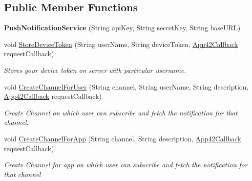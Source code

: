 \subsection*{Public Member Functions}
\begin{DoxyCompactItemize}
\item 
\hypertarget{classcom_1_1shephertz_1_1app42_1_1paas_1_1sdk_1_1windows_1_1push_1_1_push_notification_service_a173520df421c897ecd704f17814b929e}{{\bfseries Push\+Notification\+Service} (String api\+Key, String secret\+Key, String base\+U\+R\+L)}\label{classcom_1_1shephertz_1_1app42_1_1paas_1_1sdk_1_1windows_1_1push_1_1_push_notification_service_a173520df421c897ecd704f17814b929e}

\item 
void \hyperlink{classcom_1_1shephertz_1_1app42_1_1paas_1_1sdk_1_1windows_1_1push_1_1_push_notification_service_ac34a78bc93281031f3f886018cedeaa9}{Store\+Device\+Token} (String user\+Name, String device\+Token, \hyperlink{interfacecom_1_1shephertz_1_1app42_1_1paas_1_1sdk_1_1windows_1_1_app42_callback}{App42\+Callback} request\+Callback)
\begin{DoxyCompactList}\small\item\em Stores your device token on server with particular username. \end{DoxyCompactList}\item 
void \hyperlink{classcom_1_1shephertz_1_1app42_1_1paas_1_1sdk_1_1windows_1_1push_1_1_push_notification_service_a487d2384b53ab531d881678bd1006214}{Create\+Channel\+For\+User} (String channel, String user\+Name, String description, \hyperlink{interfacecom_1_1shephertz_1_1app42_1_1paas_1_1sdk_1_1windows_1_1_app42_callback}{App42\+Callback} request\+Callback)
\begin{DoxyCompactList}\small\item\em Create Channel on which user can subscribe and fetch the notification for that channel. \end{DoxyCompactList}\item 
void \hyperlink{classcom_1_1shephertz_1_1app42_1_1paas_1_1sdk_1_1windows_1_1push_1_1_push_notification_service_a9466a633cae2c4fe9f8bfab76ba51d37}{Create\+Channel\+For\+App} (String channel, String description, \hyperlink{interfacecom_1_1shephertz_1_1app42_1_1paas_1_1sdk_1_1windows_1_1_app42_callback}{App42\+Callback} request\+Callback)
\begin{DoxyCompactList}\small\item\em Create Channel for app on which user can subscribe and fetch the notification for that channel \end{DoxyCompactList}\item 

\end{DoxyCompactItemize}
